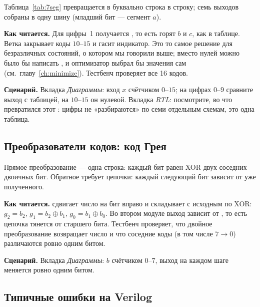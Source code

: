 Таблица~\ref{tab:7seg} превращается в  буквально строка в
строку; семь выходов собраны в одну шину 
(младший бит --- сегмент $a$).


\textbf{Как читается.} Для цифры~1 получается , то есть
горят $b$ и $c$, как в таблице. Ветка  закрывает коды
$10$--$15$ и гасит индикатор. Это то самое решение для безразличных состояний,
о котором мы говорили выше; вместо нулей можно было бы написать ,
и оптимизатор выбрал бы значения сам (см.\ главу~\ref{ch:minimize}).
Тестбенч  проверяет все 16 кодов.

\textbf{Сценарий.} Вкладка \emph{Диаграммы}: вход $x$ счётчиком $0$--$15$;
на цифрах $0$--$9$ сравните выход с таблицей, на $10$--$15$ он нулевой.
Вкладка \emph{RTL}: посмотрите, во что превратился этот :
цифры не «разбираются» по семи отдельным схемам, это одна таблица.

\subsection{Преобразователи кодов: код Грея}

Прямое преобразование --- одна строка: каждый бит равен XOR двух соседних
двоичных бит. Обратное требует цепочки: каждый следующий бит зависит от уже
полученного.



\textbf{Как читается.}  сдвигает число на
бит вправо и складывает с исходным по XOR: $g_2=b_2$, $g_1=b_2\oplus b_1$,
$g_0=b_1\oplus b_0$. Во втором модуле выход  зависит от
, то есть цепочка тянется от старшего бита. Тестбенч
 проверяет, что двойное преобразование возвращает число
и что соседние коды (в том числе $7\to0$) различаются ровно одним битом.

\textbf{Сценарий.} Вкладка \emph{Диаграммы}: $b$ счётчиком $0$--$7$, выход
 на каждом шаге меняется ровно одним битом.

\subsection{Типичные ошибки на Verilog}

